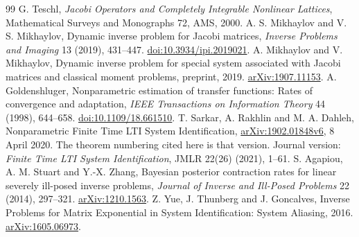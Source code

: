 \begin{thebibliography}{99}
 G. Teschl, \emph{Jacobi Operators and Completely Integrable
Nonlinear Lattices}, Mathematical Surveys and Monographs 72, AMS, 2000.
 A. S. Mikhaylov and V. S. Mikhaylov,
Dynamic inverse problem for Jacobi matrices,
\emph{Inverse Problems and Imaging} 13 (2019), 431--447.
\href{https://doi.org/10.3934/ipi.2019021}{doi:10.3934/ipi.2019021}.
 A. Mikhaylov and V. Mikhaylov,
Dynamic inverse problem for special system associated with Jacobi matrices
and classical moment problems, preprint, 2019.
\href{https://arxiv.org/abs/1907.11153}{arXiv:1907.11153}.
 A. Goldenshluger,
Nonparametric estimation of transfer functions: Rates of convergence and adaptation,
\emph{IEEE Transactions on Information Theory} 44 (1998), 644--658.
\href{https://doi.org/10.1109/18.661510}{doi:10.1109/18.661510}.
 T. Sarkar, A. Rakhlin and M. A. Dahleh,
Nonparametric Finite Time LTI System Identification,
\href{https://arxiv.org/abs/1902.01848v6}{arXiv:1902.01848v6}, 8 April 2020.
The theorem numbering cited here is that version. Journal version:
\emph{Finite Time LTI System Identification}, JMLR 22(26) (2021), 1--61.
 S. Agapiou, A. M. Stuart and Y.-X. Zhang,
Bayesian posterior contraction rates for linear severely ill-posed inverse problems,
\emph{Journal of Inverse and Ill-Posed Problems} 22 (2014), 297--321.
\href{https://arxiv.org/abs/1210.1563}{arXiv:1210.1563}.
 Z. Yue, J. Thunberg and J. Goncalves,
Inverse Problems for Matrix Exponential in System Identification: System Aliasing,
2016. \href{https://arxiv.org/abs/1605.06973}{arXiv:1605.06973}.
\end{thebibliography}
